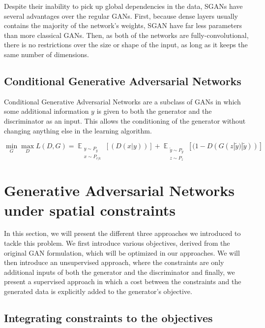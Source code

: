\documentclass{article}
\begin{document}
		Despite their inability to pick up global dependencies in the data, SGANs have several advantages over the regular GANs. First, because dense layers usually contains the majority of the network's weights, SGAN have far less parameters than more classical GANs. Then, as both of the networks are fully-convolutional, there is no restrictions over the size or shape of the input, as long as it keeps the same number of dimensions.
		
	
	\subsection{Conditional Generative Adversarial Networks}
	
		Conditional Generative Adversarial Networks\cite{mirza14} are a subclass of GANs in which some additional information $y$ is given to both the generator and the discriminator as an input. This allows the conditioning of the generator without changing anything else in the learning algorithm.
		
		\begin{equation}
		\min_G \max_D L(D, G) = \mathop{\mathbb{E}}_{\substack{y\sim P_{y}\\x\sim P_{r|k} }} [(D(x | y))] + \mathop{\mathbb{E}}_{\substack{\tilde{y}\sim P_{y}\\z\sim P_z}} [ (1-D(G(z | \tilde{y}) | \tilde{y}))]
		\end{equation}

		
\section{Generative Adversarial Networks under spatial constraints}

	In this section, we will present the different three approaches we introduced to tackle this problem. We first introduce various objectives, derived from the original GAN formulation, which will be optimized in our approaches. We will then introduce  an unsupervised approach, where the constraints are only additional inputs of both the generator and the discriminator and finally, we present a supervised approach in which a cost between the constraints and the generated data is explicitly added to the generator's objective. 
	
	\subsection{Integrating constraints to the objectives}
	
\end{document}
